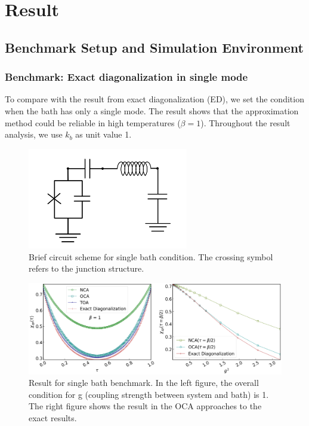 \documentclass{article}
\begin{document}
\section{Result}
\begin{spacing}{1.3}
\subsection{Benchmark Setup and Simulation Environment}
\subsubsection*{Benchmark: Exact diagonalization in single mode}
To compare with the result from exact diagonalization (ED), we set the condition when the bath has only a single mode. 
The result shows that the approximation method could be reliable in high temperatures ($\beta = 1$). Throughout the result analysis, we use $k_b$ as unit value 1.
\begin{figure}[htbp]
  \centerline{\includegraphics[width=7cm]{TexFigure/4/4_1_00_Singlebath.png}}
  \caption{Brief circuit scheme for single bath condition. The crossing symbol  refers to the junction structure.}
\end{figure}
\begin{figure}[htbp]
  \centerline{\includegraphics[width=12cm]{TexFigure/4/4_1_01_Single.png}}
  \caption{Result for single bath benchmark. In the left figure, the overall condition for g (coupling strength between system and bath) is 1. The right figure shows the result in the OCA approaches to the exact results.}
\end{figure}\pagebreak

\end{spacing}
\end{document}
